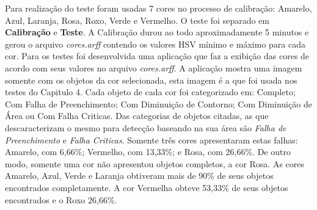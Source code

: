Para realização do teste foram usadas 7 cores no processo de calibração: Amarelo, Azul, Laranja, Rosa, Roxo, Verde e Vermelho. O teste foi separado em \textbf{Calibração} e \textbf{Teste}. A Calibração durou ao todo aproximadamente 5 minutos e gerou o arquivo \textit{cores.arff} contendo os valores HSV mínimo e máximo para cada cor. 
Para os testes foi desenvolvida uma aplicação que faz a exibição das cores de acordo com seus valores no arquivo \textit{cores.arff}. A aplicação mostra uma imagem somente com os objetos da cor selecionada, esta imagem é a que foi usada nos testes do Capitulo 4. Cada objeto de cada cor foi categorizado em: Completo; Com Falha de Preenchimento; Com Diminuição de Contorno; Com Diminuição de Área ou Com Falha Criticas. 
Das categorias de objetos citadas, as que descaracterizam o mesmo para detecção baseando na sua área são \textit{Falha de Preenchimento} e \textit{Falha Criticas}. Somente tr\^{e}s cores apresentaram estas falhas: Amarelo, com 6,66\%; Vermelho, com 13,33\%; e Rosa, com 26,66\%. De outro modo, somente uma cor não apresentou objetos completos, a cor Rosa. As cores Amarelo, Azul, Verde e Laranja obtiveram mais de 90\% de seus objetos encontrados completamente. A cor Vermelha obteve 53,33\% de seus objetos encontrados e o Roxo 26,66\%.
